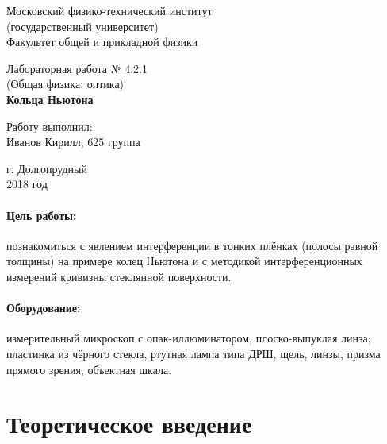 \documentclass[12pt]{kiarticle} %
\begin{document}
	
	\begin{titlepage}
	\begin{center}
		\large 	Московский физико-технический институт \\
		(государственный университет) \\
		Факультет общей и прикладной физики \\
		\vspace{0.2cm}
		
		\vspace{4.5cm}
		Лабораторная работа № 4.2.1 \\ \vspace{0.2cm}
		\large (Общая физика: оптика) \\ \vspace{0.2cm}
		\LARGE \textbf{Кольца Ньютона}
	\end{center}
	\vspace{2.3cm} \large
	
	\begin{center}
		Работу выполнил: \\
		Иванов Кирилл,
		625 группа
		\vspace{10mm}		
		
	\end{center}
	
	\begin{center} \vspace{60mm}
		г. Долгопрудный \\
		2018 год
	\end{center}
\end{titlepage}
	
	\paragraph*{Цель работы:} познакомиться с явлением интерференции в тонких плёнках (полосы равной толщины) на примере колец Ньютона и с методикой интерференционных измерений кривизны стеклянной поверхности.
	
	\paragraph*{Оборудование:} измерительный микроскоп с опак-иллюминатором, плоско-выпуклая линза; пластинка из чёрного стекла, ртутная лампа типа ДРШ, щель, линзы, призма прямого зрения, объектная шкала.
	
	\section{Теоретическое введение}
	
\end{document}
